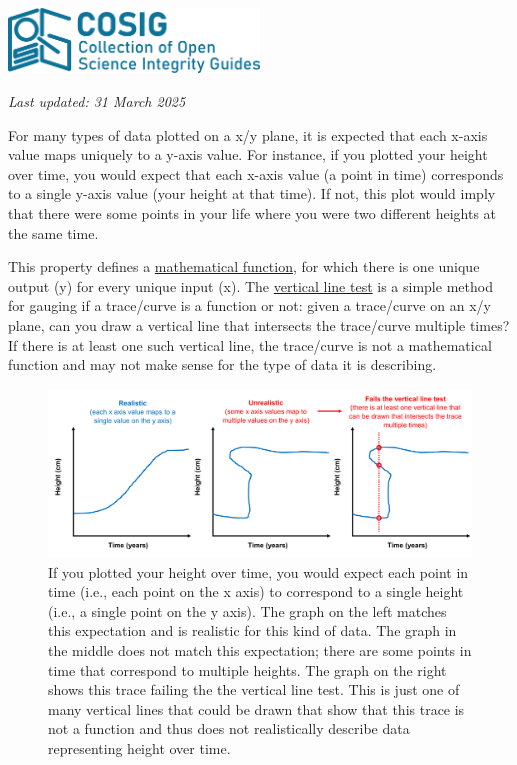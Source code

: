\documentclass[letterpaper, 12pt]{article}
\begin{document}
\flushleft\includegraphics[width=0.5\textwidth]{img/home/241017_final_logo_mockup.png}

\textit{Last updated: 31 March 2025}

For many types of data plotted on a x/y plane, it is expected that each x-axis value maps uniquely to a y-axis value. For instance, if you plotted your height over time, you would expect that each x-axis value (a point in time) corresponds to a single y-axis value (your height at that time). If not, this plot would imply that there were some points in your life where you were two different heights at the same time.

This property defines a \href{https://en.wikipedia.org/wiki/Graph_of_a_function}{mathematical function}, for which there is one unique output (y) for every unique input (x). The \href{https://en.wikipedia.org/wiki/Vertical_line_test}{vertical line test} is a simple method for gauging if a trace/curve is a function or not: given a trace/curve on an x/y plane, can you draw a vertical line that intersects the trace/curve multiple times? If there is at least one such vertical line, the trace/curve is not a mathematical function and may not make sense for the type of data it is describing.

\begin{figure}[h!tbp]
    \centering
    \includegraphics[width=\textwidth]{img/vertical_line/vertical_line_test_mockup.png}
    \caption*{If you plotted your height over time, you would expect each point in time (i.e., each point on the x axis) to correspond to a single height (i.e., a single point on the y axis). The graph on the left matches this expectation and is realistic for this kind of data. The graph in the middle does not match this expectation; there are some points in time that correspond to multiple heights. The graph on the right shows this trace failing the the vertical line test. This is just one of many vertical lines that could be drawn that show that this trace is not a function and thus does not realistically describe data representing height over time.}
\end{figure}
\end{document}
